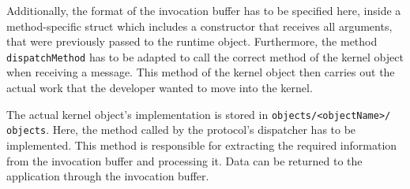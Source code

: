 Additionally, the format of the invocation buffer has to be specified here,
inside a method-specific struct which includes a constructor that receives all
arguments, that were previously passed to the runtime object.  Furthermore, the
method \texttt{dispatchMethod} has to be adapted to call the correct method of
the kernel object when receiving a message. This method of the kernel object
then carries out the actual work that the developer wanted to move into the
kernel.

The actual kernel object's implementation is stored in
\texttt{objects/<objectName>/\\objects}. Here, the method called by the
protocol's dispatcher has to be implemented. This method is responsible for
extracting the required information from the invocation buffer and processing
it. Data can be returned to the application through the invocation buffer.

% 
% 


